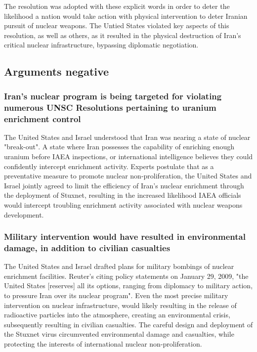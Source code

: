 \documentclass[12pt]{article}
\begin{document}
\begin{multicols}{2}
The resolution was adopted with these explicit words in order to deter the likelihood a nation would take action with physical intervention to deter Iranian pursuit of nuclear weapons. The Untied States violated key aspects of this resolution, as well as others, as it resulted in the physical destruction of Iran's critical nuclear infrastructure, bypassing diplomatic negotiation.

\subsection{Arguments negative}

\subsubsection{Iran's nuclear program is being targeted for violating numerous UNSC Resolutions pertaining to uranium enrichment control}

The United States and Israel understood that Iran was nearing a state of nuclear "break-out". A state where Iran possesses the capability of enriching enough uranium before IAEA inspections, or international intelligence believes they could confidently intercept enrichment activity. Experts postulate that as a preventative measure to promote nuclear non-proliferation, the United States and Israel jointly agreed to limit the efficiency of Iran's nuclear enrichment through the deployment of Stuxnet, resulting in the increased likelihood IAEA officials would intercept troubling enrichment activity associated with nuclear weapons development.\cite{theRealStoryOfStuxnet}

\subsubsection{Military intervention would have resulted in environmental damage, in addition to civilian casualties}

The United States and Israel drafted plans for military bombings of nuclear enrichment facilities. Reuter's citing policy statements on January 29, 2009, "the United States [reserves] all its options, ranging from diplomacy to military action, to pressure Iran over its nuclear program".\cite{usOptionsForIran} Even the most precise military intervention on nuclear infrastructure, would likely resulting in the release of radioactive particles into the atmosphere, creating an environmental crisis, subsequently resulting in civilian casualties. The careful design and deployment of the Stuxnet virus circumvented environmental damage and casualties, while protecting the interests of international nuclear non-proliferation.



\end{multicols}
\end{document}
